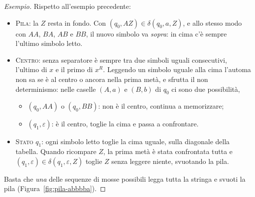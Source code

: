 \documentclass[a4paper, 11pt, oneside]{book}
\theoremstyle{formale}
\newenvironment{esempio}
    {\begin{proof}[\textit{Esempio}]\renewcommand{\qedsymbol}{$\diamond$}}
    {\end{proof}}
\begin{document}
\begin{esempio}
        Rispetto all'esempio precedente:
        \begin{itemize}
            \item \textsc{Pila}: la $Z$ resta in fondo. Con $(q_0, AZ) \in
                \delta(q_0, a, Z)$, e allo stesso modo con $AA$, $BA$, $AB$ e $BB$, il
                nuovo simbolo va \emph{sopra}: in cima c'\`e sempre l'ultimo simbolo letto.
            \item \textsc{Centro}: senza separatore \`e sempre tra due simboli uguali
                consecutivi, l'ultimo di $x$ e il primo di $x^R$. Leggendo un simbolo
                uguale alla cima l'automa non sa se \`e al centro o ancora nella prima
                met\`a, e sfrutta il non determinismo: nelle caselle $(A, a)$ e $(B, b)$
                di $q_0$ ci sono due possibilit\`a,
                \begin{itemize}
                    \item $(q_0, AA)$ o $(q_0, BB)$: non \`e il centro, continua a
                        memorizzare;
                    \item $(q_1, \varepsilon)$: \`e il centro, toglie la cima e passa a
                        confrontare.
                \end{itemize}
            \item \textsc{Stato $q_1$}: ogni simbolo letto toglie la cima uguale, sulla
                diagonale della tabella. Quando ricompare $Z$, la prima met\`a \`e stata
                confrontata tutta e $(q_1, \varepsilon) \in \delta(q_1, \varepsilon, Z)$
                toglie $Z$ senza leggere niente, svuotando la pila.
        \end{itemize}
        Basta che \emph{una} delle sequenze di mosse possibili legga tutta la stringa e
        svuoti la pila (Figura~\ref{fig:pila-abbbba}).


\end{esempio}
\end{document}
